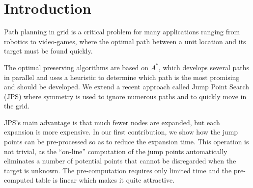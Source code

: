 \section{Introduction}

Path planning in grid is a critical problem for many applications 
ranging from robotics to video-games, 
where the optimal path 
between a unit location and its target must be found quickly.  

The optimal preserving algorithms are based on $A^*$, 
which develops several paths in parallel 
and uses a heuristic to determine 
which path is the most promising 
and should be developed.  
We extend a recent approach called Jump Point Search (JPS) 
where symmetry is used to ignore numerous paths 
and to quickly move in the grid.  

JPS's main advantage is that much fewer nodes are expanded, 
but each expansion is more expensive.  
In our first contribution, we show 
how the jump points can be pre-processed 
so as to reduce the expansion time.  
This operation is not trivial, 
as the ``on-line'' computation of the jump points 
automatically eliminates a number of potential points 
that cannot be disregarded when the target is unknown.  
The pre-computation requires only limited time 
and the pre-computed table is linear 
which makes it quite attractive.  

